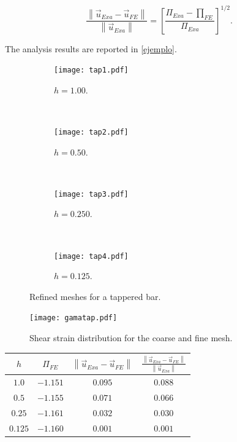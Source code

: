 \[\frac{{\left\| {{{\vec u}_{Exa}} - {{\vec u}_{FE}}} \right\|}}{{\left\| {{{\vec u}_{Exa}}} \right\|}} = {\left[ {\frac{{{\Pi _{Exa}} - {\prod _{FE}}}}{{{\Pi _{Exa}}}}} \right]^{1/2}}.\]

The analysis results are reported in \cref{ejemplo}.



\begin{figure}[H]
\centering
	\begin{subfigure}[b]{0.450\textwidth}\qquad
		\texttt{[image: tap1.pdf]}
		\caption{$h=1.00$. }
	\end{subfigure}\,
%
	\begin{subfigure}[b]{0.450\textwidth}\qquad
		\texttt{[image: tap2.pdf]}
		\caption{$h=0.50$.}
	\end{subfigure}\\
%
\centering
	\begin{subfigure}[b]{0.450\textwidth}\qquad
		\texttt{[image: tap3.pdf]}
		\caption{$h=0.250$.}
	\end{subfigure}\,
%
	\begin{subfigure}[b]{0.450\textwidth}\qquad
		\texttt{[image: tap4.pdf]}
		\caption{$h=0.125$.}
	\end{subfigure}
%
\caption{Refined meshes for a tappered bar.}
\label{mallas}
\end{figure}


\begin{figure}[H]
\centering
\texttt{[image: gamatap.pdf]}
\caption{Shear strain distribution for the coarse and fine mesh.}
\label{gamatap}
\end{figure}






\begin{center}
\begin{tabular}{ |c|c|c|c| }
  \hline
  $h$ & ${\Pi _{FE}}$ & $\left\| {{{\vec u}_{Exa}} - {{\vec u}_{FE}}} \right\|$ & $\frac{{\left\| {{{\vec u}_{Exa}} - {{\vec u}_{FE}}} \right\|}}{{\left\| {{{\vec u}_{Exa}}} \right\|}}$ \\
  \hline 
  $1.0$      & $-1.151$ & $0.095$  & $0.088$  \\
  \hline
   $0.5$     & $-1.155$ & $0.071$  & $0.066$  \\
  \hline
   $0.25$    & $-1.161$ & $0.032$  & $0.030$  \\
  \hline
   $ 0.125$  & $-1.160$ & $0.001$  & $0.001$  \\
  \hline
\end{tabular}
\label{ejemplo}
\end{center}

